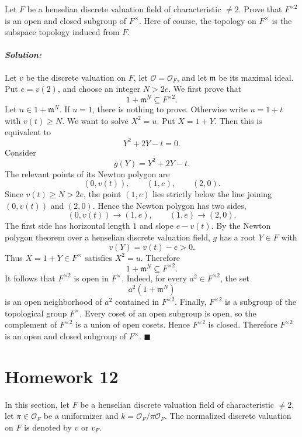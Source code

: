 \documentclass[12pt, a4paper]{article}
\newenvironment{solution}
  {\paragraph{\textit{Solution:}}\par\medskip}
  {\hfill$\blacksquare$\vspace{0.1cm}}
\begin{document}
Let $F$ be a henselian discrete valuation field of characteristic $\neq 2$. Prove that $F^{\times 2}$ is an open and closed subgroup of $F^{\times}$. Here of course, the topology on $F^{\times}$ is the subspace topology induced from $F$.

\begin{solution}
    Let $v$ be the discrete valuation on $F$, let $\mathcal O=\mathcal O_F$, and let $\mathfrak m$ be its maximal ideal. Put $e=v(2)$, and choose an integer $N>2e$. We first prove that \[ 1+\mathfrak m^N\subseteq F^{\times 2}. \] Let $u\in 1+\mathfrak m^N$. If $u=1$, there is nothing to prove. Otherwise write $u=1+t$ with $v(t)\geq N$. We want to solve $X^2=u$. Put $X=1+Y$. Then this is equivalent to \[ Y^2+2Y-t=0. \] Consider \[ g(Y)=Y^2+2Y-t. \] The relevant points of its Newton polygon are \[ (0,v(t)),\qquad (1,e),\qquad (2,0). \] Since $v(t)\geq N>2e$, the point $(1,e)$ lies strictly below the line joining $(0,v(t))$ and $(2,0)$. Hence the Newton polygon has two sides, \[ (0,v(t))\to (1,e),\qquad (1,e)\to (2,0). \] The first side has horizontal length $1$ and slope $e-v(t)$. By the Newton polygon theorem over a henselian discrete valuation field, $g$ has a root $Y\in F$ with \[ v(Y)=v(t)-e>0. \] Thus $X=1+Y\in F^\times$ satisfies $X^2=u$. Therefore \[ 1+\mathfrak m^N\subseteq F^{\times 2}. \] It follows that $F^{\times 2}$ is open in $F^\times$. Indeed, for every $a^2\in F^{\times 2}$, the set \[ a^2(1+\mathfrak m^N) \] is an open neighborhood of $a^2$ contained in $F^{\times 2}$. Finally, $F^{\times 2}$ is a subgroup of the topological group $F^\times$. Every coset of an open subgroup is open, so the complement of $F^{\times 2}$ is a union of open cosets. Hence $F^{\times 2}$ is closed. Therefore $F^{\times 2}$ is an open and closed subgroup of $F^\times$.
\end{solution}


\section*{Homework 12}

In this section, let $F$ be a henselian discrete valuation field of
characteristic $\neq 2$, let $\pi\in \mathcal O_F$ be a uniformizer and
$k=\mathcal O_F/\pi\mathcal O_F$. The normalized discrete valuation on $F$ is
denoted by $v$ or $v_F$.
\end{document}
